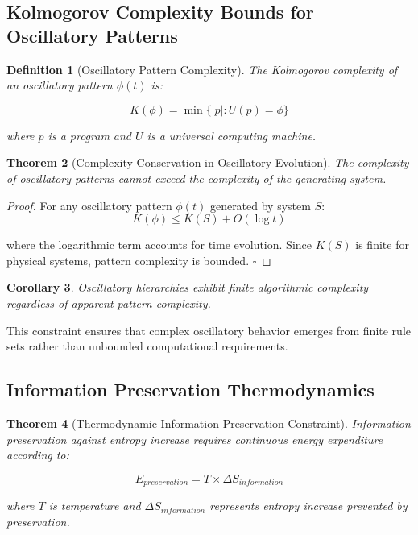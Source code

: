 \documentclass[11pt]{article}
\newtheorem{theorem}{Theorem}[section]
\newtheorem{corollary}[theorem]{Corollary}
\newtheorem{definition}[theorem]{Definition}
\theoremstyle{remark}
\begin{document}
\subsection{Kolmogorov Complexity Bounds for Oscillatory Patterns}

\begin{definition}[Oscillatory Pattern Complexity]
The Kolmogorov complexity of an oscillatory pattern $\phi(t)$ is:

$$K(\phi) = \min\{|p| : U(p) = \phi\}$$

where $p$ is a program and $U$ is a universal computing machine.
\end{definition}

\begin{theorem}[Complexity Conservation in Oscillatory Evolution]
The complexity of oscillatory patterns cannot exceed the complexity of the generating system.
\end{theorem}

\begin{proof}
For any oscillatory pattern $\phi(t)$ generated by system $S$:
$$K(\phi) \leq K(S) + O(\log t)$$

where the logarithmic term accounts for time evolution. Since $K(S)$ is finite for physical systems, pattern complexity is bounded. $\square$
\end{proof}

\begin{corollary}
Oscillatory hierarchies exhibit finite algorithmic complexity regardless of apparent pattern complexity.
\end{corollary}

This constraint ensures that complex oscillatory behavior emerges from finite rule sets rather than unbounded computational requirements.

\subsection{Information Preservation Thermodynamics}

\begin{theorem}[Thermodynamic Information Preservation Constraint]
Information preservation against entropy increase requires continuous energy expenditure according to:

$$E_{preservation} = T \times \Delta S_{information}$$

where $T$ is temperature and $\Delta S_{information}$ represents entropy increase prevented by preservation.
\end{theorem}
\end{document}
